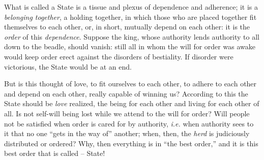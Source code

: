 \myhrule


What is called a State is a tissue and plexus of dependence and adherence; it 
is a \textit{belonging together}, a holding together, in which those who are 
placed together fit themselves to each other, or, in short, mutually depend on 
each other: it is the \textit{order} of this \textit{dependence}. Suppose the 
king, whose authority lends authority to all down to the beadle, should 
vanish: still all in whom the will for order was awake would keep order erect 
against the disorders of bestiality. If disorder were victorious, the State 
would be at an end.

But is this thought of love, to fit ourselves to each other, to adhere to each 
other and depend on each other, really capable of winning us? According to 
this the State should be \textit{love} realized, the being for each other and 
living for each other of all. Is not self-will being lost while we attend to 
the will for order? Will people not be satisfied when order is cared for by 
authority, \textit{i.e.} when authority sees to it that no one ``gets in the 
way of'' another; when, then, the \textit{herd} is judiciously distributed or 
ordered? Why, then everything is in ``the best order,'' and it is this best 
order that is called -- State!

